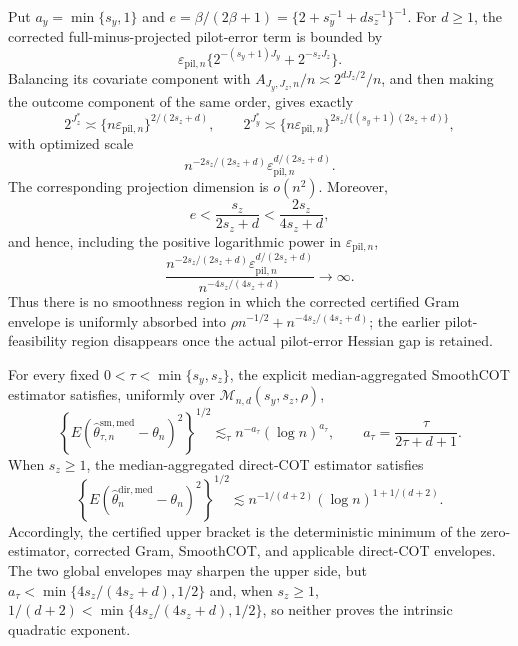 Put \(a_y=\min\{s_y,1\}\) and \(e=\beta/(2\beta+1)=\{2+s_y^{-1}+ds_z^{-1}\}^{-1}\). For \(d\ge1\), the corrected full-minus-projected pilot-error term is bounded by
\[
\varepsilon_{\mathrm{pil},n}\{2^{-(s_y+1)J_y}+2^{-s_zJ_z}\}.
\]
Balancing its covariate component with \(A_{J_y,J_z,n}/n\asymp2^{dJ_z/2}/n\), and then making the outcome component of the same order, gives exactly
\[
2^{J_z^*}\asymp\{n\varepsilon_{\mathrm{pil},n}\}^{2/(2s_z+d)},
\qquad
2^{J_y^*}\asymp\{n\varepsilon_{\mathrm{pil},n}\}^{2s_z/\{(s_y+1)(2s_z+d)\}},
\]
with optimized scale
\[
n^{-2s_z/(2s_z+d)}\varepsilon_{\mathrm{pil},n}^{d/(2s_z+d)}.
\]
The corresponding projection dimension is \(o(n^2)\).  Moreover,
\[
e<\frac{s_z}{2s_z+d}<\frac{2s_z}{4s_z+d},
\]
and hence, including the positive logarithmic power in \(\varepsilon_{\mathrm{pil},n}\),
\[
\frac{n^{-2s_z/(2s_z+d)}\varepsilon_{\mathrm{pil},n}^{d/(2s_z+d)}}{n^{-4s_z/(4s_z+d)}}\longrightarrow\infty.
\]
Thus there is no smoothness region in which the corrected certified Gram envelope is uniformly absorbed into \(\rho n^{-1/2}+n^{-4s_z/(4s_z+d)}\); the earlier pilot-feasibility region disappears once the actual pilot-error Hessian gap is retained.

For every fixed \(0<\tau<\min\{s_y,s_z\}\), the explicit median-aggregated SmoothCOT estimator satisfies, uniformly over \(\mathcal M_{n,d}(s_y,s_z,\rho)\),
\[
\left\{E(\widehat\theta^{\mathrm{sm,med}}_{\tau,n}-\theta_n)^2\right\}^{1/2}
\lesssim_\tau n^{-a_\tau}(\log n)^{a_\tau},
\qquad a_\tau=\frac{\tau}{2\tau+d+1}.
\]
When \(s_z\ge1\), the median-aggregated direct-COT estimator satisfies
\[
\left\{E(\widehat\theta_n^{\mathrm{dir,med}}-\theta_n)^2\right\}^{1/2}
\lesssim n^{-1/(d+2)}(\log n)^{1+1/(d+2)}.
\]
Accordingly, the certified upper bracket is the deterministic minimum of the zero-estimator, corrected Gram, SmoothCOT, and applicable direct-COT envelopes.  The two global envelopes may sharpen the upper side, but \(a_\tau<\min\{4s_z/(4s_z+d),1/2\}\) and, when \(s_z\ge1\), \(1/(d+2)<\min\{4s_z/(4s_z+d),1/2\}\), so neither proves the intrinsic quadratic exponent.